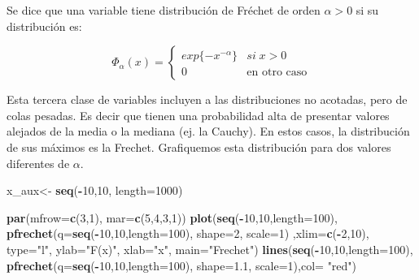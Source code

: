 \documentclass[
]{book}
\newenvironment{Shaded}{\begin{snugshade}}{\end{snugshade}}
\newcommand{\AttributeTok}[1]{\textcolor[rgb]{0.13,0.29,0.53}{#1}}
\newcommand{\DecValTok}[1]{\textcolor[rgb]{0.00,0.00,0.81}{#1}}
\newcommand{\FloatTok}[1]{\textcolor[rgb]{0.00,0.00,0.81}{#1}}
\newcommand{\FunctionTok}[1]{\textcolor[rgb]{0.13,0.29,0.53}{\textbf{#1}}}
\newcommand{\NormalTok}[1]{#1}
\newcommand{\OtherTok}[1]{\textcolor[rgb]{0.56,0.35,0.01}{#1}}
\newcommand{\SpecialCharTok}[1]{\textcolor[rgb]{0.81,0.36,0.00}{\textbf{#1}}}
\newcommand{\StringTok}[1]{\textcolor[rgb]{0.31,0.60,0.02}{#1}}
\theoremstyle{definition}
\theoremstyle{definition}
\theoremstyle{definition}
\theoremstyle{definition}
\theoremstyle{remark}
\begin{document}
Se dice que una variable tiene distribución de
Fréchet de orden \(\alpha>0\) si su distribución es:

\[
\Phi_{\alpha}(x)=\begin{cases}
exp\{-x^{-\alpha}\} & si\;x>0\\
0 & \text{en otro caso}
\end{cases}
\]

Esta tercera clase de variables incluyen a las distribuciones no acotadas, pero de colas pesadas. Es decir que tienen una probabilidad alta de presentar valores alejados de la media o la mediana (ej. la Cauchy). En estos casos, la distribución de sus máximos es la Frechet. Grafiquemos esta distribución para dos valores diferentes de \(\alpha\).

\begin{Shaded}
\begin{Highlighting}[]
\NormalTok{x\_aux}\OtherTok{\textless{}{-}} \FunctionTok{seq}\NormalTok{(}\SpecialCharTok{{-}}\DecValTok{10}\NormalTok{,}\DecValTok{10}\NormalTok{, }\AttributeTok{length=}\DecValTok{1000}\NormalTok{)}

\FunctionTok{par}\NormalTok{(}\AttributeTok{mfrow=}\FunctionTok{c}\NormalTok{(}\DecValTok{3}\NormalTok{,}\DecValTok{1}\NormalTok{), }\AttributeTok{mar=}\FunctionTok{c}\NormalTok{(}\DecValTok{5}\NormalTok{,}\DecValTok{4}\NormalTok{,}\DecValTok{3}\NormalTok{,}\DecValTok{1}\NormalTok{))}
\FunctionTok{plot}\NormalTok{(}\FunctionTok{seq}\NormalTok{(}\SpecialCharTok{{-}}\DecValTok{10}\NormalTok{,}\DecValTok{10}\NormalTok{,}\AttributeTok{length=}\DecValTok{100}\NormalTok{), }\FunctionTok{pfrechet}\NormalTok{(}\AttributeTok{q=}\FunctionTok{seq}\NormalTok{(}\SpecialCharTok{{-}}\DecValTok{10}\NormalTok{,}\DecValTok{10}\NormalTok{,}\AttributeTok{length=}\DecValTok{100}\NormalTok{), }\AttributeTok{shape=}\DecValTok{2}\NormalTok{, }\AttributeTok{scale=}\DecValTok{1}\NormalTok{) ,}\AttributeTok{xlim=}\FunctionTok{c}\NormalTok{(}\SpecialCharTok{{-}}\DecValTok{2}\NormalTok{,}\DecValTok{10}\NormalTok{), }\AttributeTok{type=}\StringTok{"l"}\NormalTok{, }\AttributeTok{ylab=}\StringTok{"F(x)"}\NormalTok{, }\AttributeTok{xlab=}\StringTok{"x"}\NormalTok{, }\AttributeTok{main=}\StringTok{"Frechet"}\NormalTok{)}
\FunctionTok{lines}\NormalTok{(}\FunctionTok{seq}\NormalTok{(}\SpecialCharTok{{-}}\DecValTok{10}\NormalTok{,}\DecValTok{10}\NormalTok{,}\AttributeTok{length=}\DecValTok{100}\NormalTok{), }\FunctionTok{pfrechet}\NormalTok{(}\AttributeTok{q=}\FunctionTok{seq}\NormalTok{(}\SpecialCharTok{{-}}\DecValTok{10}\NormalTok{,}\DecValTok{10}\NormalTok{,}\AttributeTok{length=}\DecValTok{100}\NormalTok{), }\AttributeTok{shape=}\FloatTok{1.1}\NormalTok{, }\AttributeTok{scale=}\DecValTok{1}\NormalTok{),}\AttributeTok{col=} \StringTok{"red"}\NormalTok{)}


\end{Highlighting}
\end{Shaded}
\end{document}
